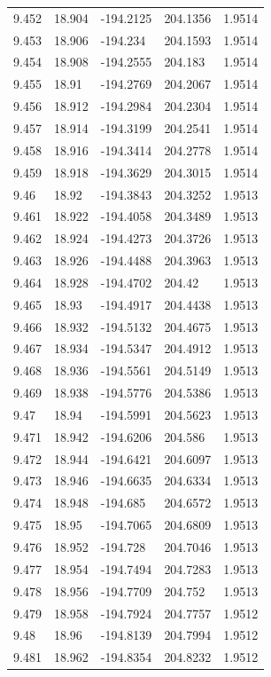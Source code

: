 \begin{tabular}{lllll}
9.452 & 18.904 & -194.2125 & 204.1356 & 1.9514 \\
9.453 & 18.906 & -194.234 & 204.1593 & 1.9514 \\
9.454 & 18.908 & -194.2555 & 204.183 & 1.9514 \\
9.455 & 18.91 & -194.2769 & 204.2067 & 1.9514 \\
9.456 & 18.912 & -194.2984 & 204.2304 & 1.9514 \\
9.457 & 18.914 & -194.3199 & 204.2541 & 1.9514 \\
9.458 & 18.916 & -194.3414 & 204.2778 & 1.9514 \\
9.459 & 18.918 & -194.3629 & 204.3015 & 1.9514 \\
9.46 & 18.92 & -194.3843 & 204.3252 & 1.9513 \\
9.461 & 18.922 & -194.4058 & 204.3489 & 1.9513 \\
9.462 & 18.924 & -194.4273 & 204.3726 & 1.9513 \\
9.463 & 18.926 & -194.4488 & 204.3963 & 1.9513 \\
9.464 & 18.928 & -194.4702 & 204.42 & 1.9513 \\
9.465 & 18.93 & -194.4917 & 204.4438 & 1.9513 \\
9.466 & 18.932 & -194.5132 & 204.4675 & 1.9513 \\
9.467 & 18.934 & -194.5347 & 204.4912 & 1.9513 \\
9.468 & 18.936 & -194.5561 & 204.5149 & 1.9513 \\
9.469 & 18.938 & -194.5776 & 204.5386 & 1.9513 \\
9.47 & 18.94 & -194.5991 & 204.5623 & 1.9513 \\
9.471 & 18.942 & -194.6206 & 204.586 & 1.9513 \\
9.472 & 18.944 & -194.6421 & 204.6097 & 1.9513 \\
9.473 & 18.946 & -194.6635 & 204.6334 & 1.9513 \\
9.474 & 18.948 & -194.685 & 204.6572 & 1.9513 \\
9.475 & 18.95 & -194.7065 & 204.6809 & 1.9513 \\
9.476 & 18.952 & -194.728 & 204.7046 & 1.9513 \\
9.477 & 18.954 & -194.7494 & 204.7283 & 1.9513 \\
9.478 & 18.956 & -194.7709 & 204.752 & 1.9513 \\
9.479 & 18.958 & -194.7924 & 204.7757 & 1.9512 \\
9.48 & 18.96 & -194.8139 & 204.7994 & 1.9512 \\
9.481 & 18.962 & -194.8354 & 204.8232 & 1.9512 \\

\end{tabular}
